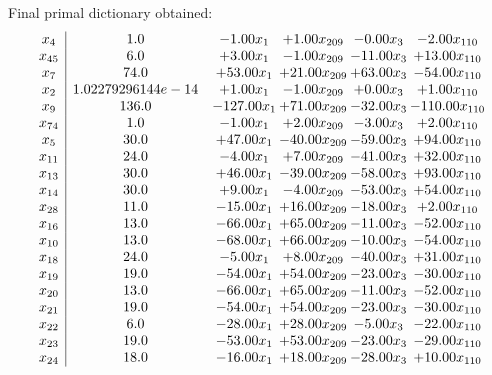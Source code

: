 \documentclass[8pt]{article}
\begin{document}
 Final primal dictionary obtained: 
\[\begin{array}{c| c c@{\hskip 2pt} c@{\hskip 2pt} c@{\hskip 2pt} c@{\hskip 2pt} }
 x_{4}   &  1.0 & -1.00 x_{1} & +  1.00 x_{209} & -0.00 x_{3} & -2.00 x_{110}\\
 x_{45}   &  6.0 & +  3.00 x_{1} & -1.00 x_{209} & -11.00 x_{3} & + 13.00 x_{110}\\
 x_{7}   &  74.0 & + 53.00 x_{1} & + 21.00 x_{209} & + 63.00 x_{3} & -54.00 x_{110}\\
 x_{2}   &  1.02279296144e-14 & +  1.00 x_{1} & -1.00 x_{209} & +  0.00 x_{3} & +  1.00 x_{110}\\
 x_{9}   &  136.0 & -127.00 x_{1} & + 71.00 x_{209} & -32.00 x_{3} & -110.00 x_{110}\\
 x_{74}   &  1.0 & -1.00 x_{1} & +  2.00 x_{209} & -3.00 x_{3} & +  2.00 x_{110}\\
 x_{5}   &  30.0 & + 47.00 x_{1} & -40.00 x_{209} & -59.00 x_{3} & + 94.00 x_{110}\\
 x_{11}   &  24.0 & -4.00 x_{1} & +  7.00 x_{209} & -41.00 x_{3} & + 32.00 x_{110}\\
 x_{13}   &  30.0 & + 46.00 x_{1} & -39.00 x_{209} & -58.00 x_{3} & + 93.00 x_{110}\\
 x_{14}   &  30.0 & +  9.00 x_{1} & -4.00 x_{209} & -53.00 x_{3} & + 54.00 x_{110}\\
 x_{28}   &  11.0 & -15.00 x_{1} & + 16.00 x_{209} & -18.00 x_{3} & +  2.00 x_{110}\\
 x_{16}   &  13.0 & -66.00 x_{1} & + 65.00 x_{209} & -11.00 x_{3} & -52.00 x_{110}\\
 x_{10}   &  13.0 & -68.00 x_{1} & + 66.00 x_{209} & -10.00 x_{3} & -54.00 x_{110}\\
 x_{18}   &  24.0 & -5.00 x_{1} & +  8.00 x_{209} & -40.00 x_{3} & + 31.00 x_{110}\\
 x_{19}   &  19.0 & -54.00 x_{1} & + 54.00 x_{209} & -23.00 x_{3} & -30.00 x_{110}\\
 x_{20}   &  13.0 & -66.00 x_{1} & + 65.00 x_{209} & -11.00 x_{3} & -52.00 x_{110}\\
 x_{21}   &  19.0 & -54.00 x_{1} & + 54.00 x_{209} & -23.00 x_{3} & -30.00 x_{110}\\
 x_{22}   &  6.0 & -28.00 x_{1} & + 28.00 x_{209} & -5.00 x_{3} & -22.00 x_{110}\\
 x_{23}   &  19.0 & -53.00 x_{1} & + 53.00 x_{209} & -23.00 x_{3} & -29.00 x_{110}\\
 x_{24}   &  18.0 & -16.00 x_{1} & + 18.00 x_{209} & -28.00 x_{3} & + 10.00 x_{110}\\

\end{array}\]
\end{document}
